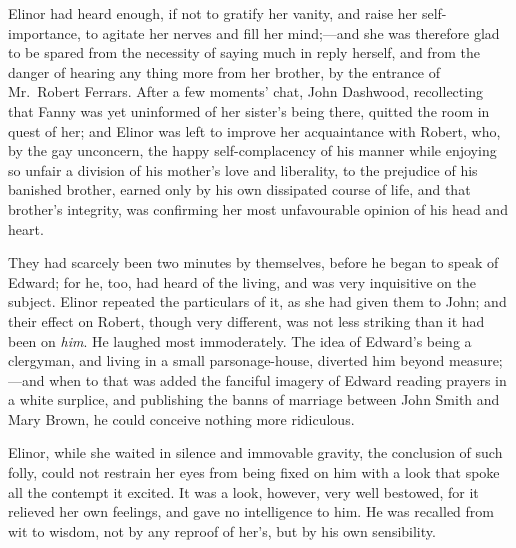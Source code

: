 Elinor had heard enough, if not to gratify her vanity,
and raise her self-importance, to agitate her nerves
and fill her mind;---and she was therefore glad to be
spared from the necessity of saying much in reply herself,
and from the danger of hearing any thing more from
her brother, by the entrance of Mr.\ Robert Ferrars.
After a few moments' chat, John Dashwood, recollecting that
Fanny was yet uninformed of her sister's being there,
quitted the room in quest of her; and Elinor was left
to improve her acquaintance with Robert, who, by the
gay unconcern, the happy self-complacency of his manner
while enjoying so unfair a division of his mother's love
and liberality, to the prejudice of his banished brother,
earned only by his own dissipated course of life, and that
brother's integrity, was confirming her most unfavourable
opinion of his head and heart.

They had scarcely been two minutes by themselves,
before he began to speak of Edward; for he, too, had heard
of the living, and was very inquisitive on the subject.
Elinor repeated the particulars of it, as she had given them
to John; and their effect on Robert, though very different,
was not less striking than it had been on \emph{him}.  He laughed
most immoderately.  The idea of Edward's being a clergyman,
and living in a small parsonage-house, diverted him
beyond measure;---and when to that was added the fanciful
imagery of Edward reading prayers in a white surplice,
and publishing the banns of marriage between John Smith and
Mary Brown, he could conceive nothing more ridiculous.

Elinor, while she waited in silence and immovable
gravity, the conclusion of such folly, could not restrain
her eyes from being fixed on him with a look that spoke
all the contempt it excited.  It was a look, however,
very well bestowed, for it relieved her own feelings, and gave
no intelligence to him.  He was recalled from wit to wisdom,
not by any reproof of her's, but by his own sensibility.

